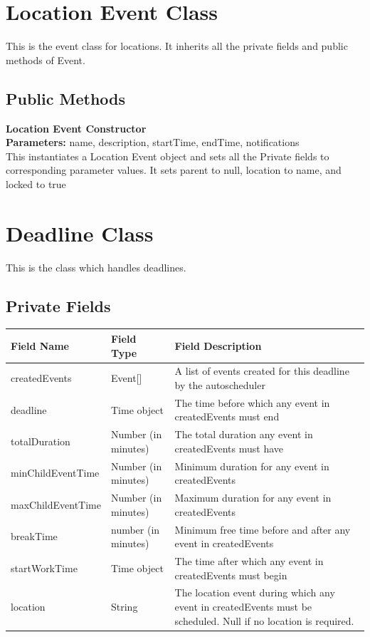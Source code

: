 \documentclass{scrreprt}
\begin{document}
\section{Location Event Class}

This is the event class for locations. It inherits all the private fields and public methods of Event.

\subsection{Public Methods}

\textbf{Location Event Constructor} \\
\textbf{Parameters:} name, description, startTime, endTime, notifications \\
This instantiates a Location Event object and sets all the Private fields to corresponding parameter values. It sets parent to null, location to name, and locked to true

\section{Deadline Class}

This is the class which handles deadlines.

\subsection{Private Fields}

\begin{center}
\begin{longtable}{ | p{4cm} | p{5cm} | p{6cm} | }
\hline
\textbf{Field Name} & \textbf{Field Type} & \textbf{Field Description} \\
\hline
createdEvents & Event[] & A list of events created for this deadline by the autoscheduler \\
\hline
deadline & Time object & The time before which any event in createdEvents must end \\
\hline
totalDuration & Number (in minutes) & The total duration any event in createdEvents must have \\
\hline
minChildEventTime & Number (in minutes) & Minimum duration for any event in createdEvents \\
\hline
maxChildEventTime & Number (in minutes) & Maximum duration for any event in createdEvents \\
\hline
breakTime & number (in minutes) & Minimum free time before and after any event in createdEvents \\
\hline
startWorkTime & Time object & The time after which any event in createdEvents must begin \\
\hline
location & String & The location event during which any event in createdEvents must be scheduled. Null if no location is required. \\
\hline
\end{longtable}
\end{center}
\end{document}
